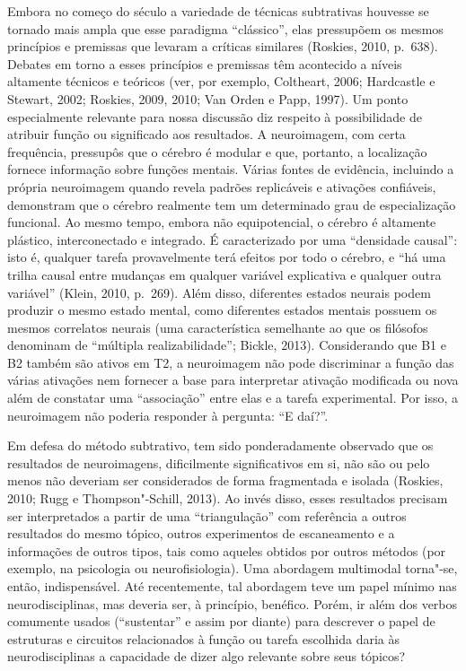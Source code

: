 Embora no começo do século  a variedade de técnicas subtrativas
houvesse se tornado mais ampla que esse paradigma ``clássico'', elas
pressupõem os mesmos princípios e premissas que levaram a críticas
similares (Roskies, 2010, p.~638). Debates em torno a esses princípios e
premissas têm acontecido a níveis altamente técnicos e teóricos (ver,
por exemplo, Coltheart, 2006; Hardcastle e Stewart, 2002; Roskies, 2009,
2010; Van Orden e Papp, 1997). Um ponto especialmente relevante para
nossa discussão diz respeito à possibilidade de atribuir função ou
significado aos resultados. A neuroimagem, com certa frequência,
pressupôs que o cérebro é modular e que, portanto, a localização fornece
informação sobre funções mentais. Várias fontes de evidência, incluindo
a própria neuroimagem quando revela padrões replicáveis e ativações
confiáveis, demonstram que o cérebro realmente tem um determinado grau
de especialização funcional. Ao mesmo tempo, embora não equipotencial, o
cérebro é altamente plástico, interconectado e integrado. É
caracterizado por uma ``densidade causal'': isto é, qualquer tarefa
provavelmente terá efeitos por todo o cérebro, e ``há uma trilha causal
entre mudanças em qualquer variável explicativa e qualquer outra
variável'' (Klein, 2010, p.~269). Além disso, diferentes estados neurais
podem produzir o mesmo estado mental, como diferentes estados mentais
possuem os mesmos correlatos neurais (uma característica semelhante ao
que os filósofos denominam de ``múltipla realizabilidade''; Bickle,
2013). Considerando que B1 e B2 também são ativos em T2, a neuroimagem
não pode discriminar a função das várias ativações nem fornecer a base
para interpretar ativação modificada ou nova além de constatar uma
``associação'' entre elas e a tarefa experimental. Por isso, a
neuroimagem não poderia responder à pergunta: ``E daí?''.

Em defesa do método subtrativo, tem sido ponderadamente observado que os
resultados de neuroimagens, dificilmente significativos em si, não são
ou pelo menos não deveriam ser considerados de forma fragmentada e
isolada (Roskies, 2010; Rugg e Thompson"-Schill, 2013). Ao invés disso,
esses resultados precisam ser interpretados a partir de uma
``triangulação'' com referência a outros resultados do mesmo tópico,
outros experimentos de escaneamento e a informações de outros tipos,
tais como aqueles obtidos por outros métodos (por exemplo, na psicologia
ou neurofisiologia). Uma abordagem multimodal torna"-se, então,
indispensável. Até recentemente, tal abordagem teve um papel mínimo nas
neurodisciplinas, mas deveria ser, à princípio, benéfico. Porém, ir além
dos verbos comumente usados (``sustentar'' e assim por diante) para
descrever o papel de estruturas e circuitos relacionados à função ou
tarefa escolhida daria às neurodisciplinas a capacidade de dizer algo
relevante sobre seus tópicos?


